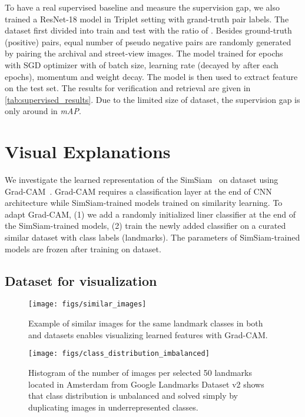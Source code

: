 \documentclass[a4paper,conference]{IEEEtran}
\begin{document}
To have a real supervised baseline and measure the supervision gap, we also trained a ResNet-18 model in Triplet setting \cite{balntas2016learning} with grand-truth pair labels. The dataset first divided into train and test with the ratio of . Besides ground-truth (positive) pairs, equal number of pseudo negative pairs are randomly generated by pairing the archival and street-view images. The model trained for  epochs with SGD optimizer with  of batch size,  learning rate (decayed by  after each  epochs),  momentum and  weight decay. The model is then used to extract feature on the test set. The results for verification and retrieval are given in \cref{tab:supervised_results}. Due to the limited size of \amstertime dataset, the supervision gap is only around  in {\textit{mAP}}. 



 \section{Visual Explanations}
\label{sec:visualization}
We investigate the learned representation of the SimSiam~\cite{chen2020simsiam} on \amstertime dataset using   Grad-CAM~\cite{selvaraju2017grad}. 
Grad-CAM requires a classification layer at the end of CNN architecture while SimSiam-trained models trained on similarity learning. To adapt Grad-CAM, (1) we add a randomly initialized liner classifier at the end of the SimSiam-trained models, (2) train the newly added classifier on a curated similar dataset with class labels (landmarks). The parameters of SimSiam-trained models are frozen after training on \amstertime dataset. 

\subsection{Dataset for visualization}

\begin{figure}[t]
\centering
\texttt{[image: figs/similar\_images]}
\caption{Example of similar images for the same landmark classes in both \amstertime and \amsterdam datasets enables visualizing learned features with Grad-CAM.}
\label{fig:similar_images}
\end{figure}

\begin{figure}[t]
\centering
\texttt{[image: figs/class\_distribution\_imbalanced]}
\caption{Histogram of the number of images per selected 50 landmarks located in Amsterdam from Google Landmarks Dataset v2 shows that class distribution is unbalanced and solved simply by duplicating images in underrepresented classes.}
\label{fig:class_distribution}
\end{figure}
\end{document}
